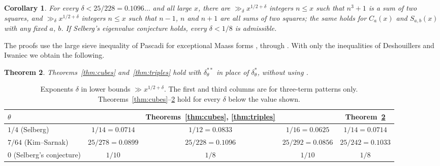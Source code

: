 \documentclass[11pt]{amsart}
\newtheorem{theorem}{Theorem}[section]
\newtheorem{corollary}[theorem]{Corollary}
\theoremstyle{remark}
\theoremstyle{definition}
\numberwithin{equation}{section}
\begin{document}
\begin{corollary}\label{cor:main}
For every $\delta<25/228=0.1096\ldots$ and all large $x$, there are $\gg_\delta x^{1/2+\delta}$ integers $n\le x$ such that $n^3+1$ is a sum of two squares, and $\gg_\delta x^{1/2+\delta}$ integers $n\le x$ such that $n-1$, $n$ and $n+1$ are all sums of two squares; the same holds for $C_a(x)$ and $S_{a,b}(x)$ with any fixed $a$, $b$. If Selberg's eigenvalue conjecture holds, every $\delta<1/8$ is admissible.
\end{corollary}

The proofs use the large sieve inequality of Pascadi for exceptional Maass forms \cite[Theorem~2]{Pas}, through \cite[Theorem~6.1(a)]{IC}. With only the inequalities of Deshouillers and Iwaniec \cite{DI} we obtain the following.

\begin{theorem}\label{thm:DI}
Theorems~\ref{thm:cubes} and~\ref{thm:triples} hold with $\delta^{**}_\theta$ in place of $\delta^*_\theta$, without using \cite[Theorem~2]{Pas}.
\end{theorem}

\begin{table}[h]
\centering
\setlength{\tabcolsep}{4pt}\small
\begin{tabular}{lcccc}
\toprule
$\theta$ & \cite[Thm.~1.1]{IC} & Theorems~\ref{thm:cubes}, \ref{thm:triples} & \cite[Thm.~1.3]{IC} & Theorem~\ref{thm:DI}\\
\midrule
$1/4$ (Selberg) & $1/14=0.0714$ & $1/12=0.0833$ & $1/16=0.0625$ & $1/14=0.0714$\\
$7/64$ (Kim--Sarnak) & $25/278=0.0899$ & $25/228=0.1096$ & $25/292=0.0856$ & $25/242=0.1033$\\
$0$ (Selberg's conjecture) & $1/10$ & $1/8$ & $1/10$ & $1/8$\\
\bottomrule
\end{tabular}
\caption{Exponents $\delta$ in lower bounds $\gg x^{1/2+\delta}$. The first and third columns are for three-term patterns only. Theorems~\ref{thm:cubes}--\ref{thm:DI} hold for every $\delta$ below the value shown.}
\label{tab:exponents}
\end{table}
\end{document}
